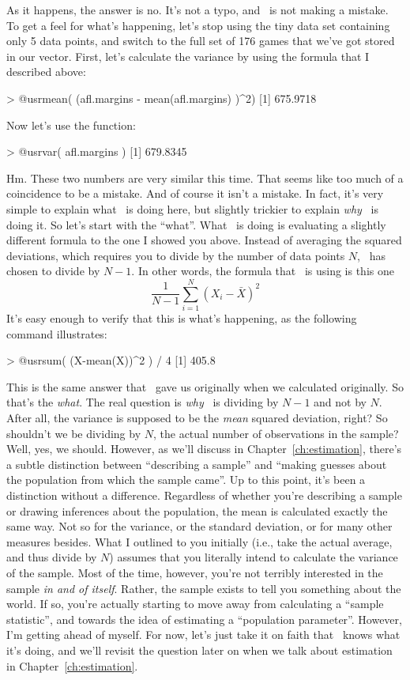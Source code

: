 As it happens, the answer is no. It's not a typo, and \R\ is not making a mistake. To get a feel for what's happening, let's stop using the tiny data set containing only 5 data points, and switch to the full set of 176 games that we've got stored in our   vector. First, let's calculate the variance by using the formula that I described above:
\begin{rblock1}
> @usr{mean( (afl.margins - mean(afl.margins) )^2)}
[1] 675.9718
\end{rblock1}
Now let's use the  function:
\begin{rblock1}
> @usr{var( afl.margins )}
[1] 679.8345
\end{rblock1}
Hm. These two numbers are very similar this time. That seems like too much of a coincidence to be a mistake. And of course it isn't a mistake. In fact, it's very simple to explain what \R\ is doing here, but slightly trickier to explain {\it why} \R\ is doing it. So let's start with the ``what''. What \R\ is doing is evaluating a slightly different formula to the one I showed you above. Instead of averaging the squared deviations, which requires you to divide by the number of data points $N$, \R\ has chosen to divide by $N-1$. In other words, the formula that \R\ is using is this one  
$$
\frac{1}{N-1} \sum_{i=1}^N \left( X_i - \bar{X} \right)^2
$$
It's easy enough to verify that this is what's happening, as the following command illustrates:
\begin{rblock1}
> @usr{sum( (X-mean(X))^2 ) / 4}
[1] 405.8
\end{rblock1}
This is the same answer that \R\ gave us originally when we calculated  originally. So that's the {\it what}. The real question is {\it why} \R\ is dividing by $N-1$ and not by $N$. After all, the variance is supposed to be the {\it mean} squared deviation, right? So shouldn't we be dividing by $N$, the actual number of observations in the sample? Well, yes, we should. However, as we'll discuss in Chapter~\ref{ch:estimation}, there's a subtle distinction between ``describing a sample'' and ``making guesses about the population from which the sample came''. Up to this point, it's been a distinction without a difference. Regardless of whether you're describing a sample or drawing inferences about the population, the mean is calculated exactly the same way. Not so for the variance, or the standard deviation, or for many other measures besides. What I outlined to you initially (i.e., take the actual average, and thus divide by $N$) assumes that you literally intend to calculate the variance of the sample. Most of the time, however, you're not terribly interested in the sample {\it in and of itself}. Rather, the sample exists to tell you something about the world. If so, you're actually starting to move away from calculating a ``sample statistic'', and towards the idea of estimating a ``population parameter''. However, I'm getting ahead of myself. For now, let's just take it on faith that \R\ knows what it's doing, and we'll revisit the question later on when we talk about estimation in Chapter~\ref{ch:estimation}. 

